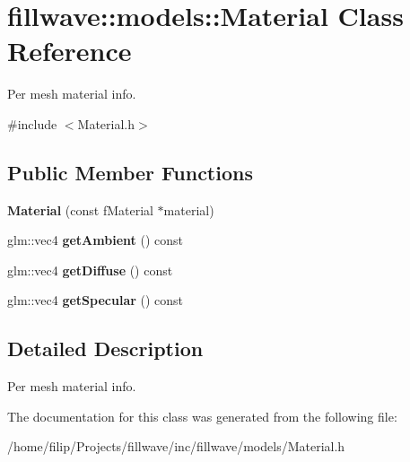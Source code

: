 \hypertarget{classfillwave_1_1models_1_1Material}{}\section{fillwave\+:\+:models\+:\+:Material Class Reference}
\label{classfillwave_1_1models_1_1Material}


Per mesh material info.  




{\ttfamily \#include $<$Material.\+h$>$}

\subsection*{Public Member Functions}
\begin{DoxyCompactItemize}
\item 
\hypertarget{classfillwave_1_1models_1_1Material_a4dbd7486f1d41540f7fd1592765765d0}{}{\bfseries Material} (const f\+Material $\ast$material)\label{classfillwave_1_1models_1_1Material_a4dbd7486f1d41540f7fd1592765765d0}

\item 
\hypertarget{classfillwave_1_1models_1_1Material_a4e2c83dce264b76665290467c7205ed9}{}glm\+::vec4 {\bfseries get\+Ambient} () const \label{classfillwave_1_1models_1_1Material_a4e2c83dce264b76665290467c7205ed9}

\item 
\hypertarget{classfillwave_1_1models_1_1Material_af5489197f97c8d309dfd41aa75938a45}{}glm\+::vec4 {\bfseries get\+Diffuse} () const \label{classfillwave_1_1models_1_1Material_af5489197f97c8d309dfd41aa75938a45}

\item 
\hypertarget{classfillwave_1_1models_1_1Material_a9b8aa1fab5fdf639f84e875354dd4987}{}glm\+::vec4 {\bfseries get\+Specular} () const \label{classfillwave_1_1models_1_1Material_a9b8aa1fab5fdf639f84e875354dd4987}

\end{DoxyCompactItemize}


\subsection{Detailed Description}
Per mesh material info. 

The documentation for this class was generated from the following file\+:\begin{DoxyCompactItemize}
\item 
/home/filip/\+Projects/fillwave/inc/fillwave/models/Material.\+h\end{DoxyCompactItemize}
